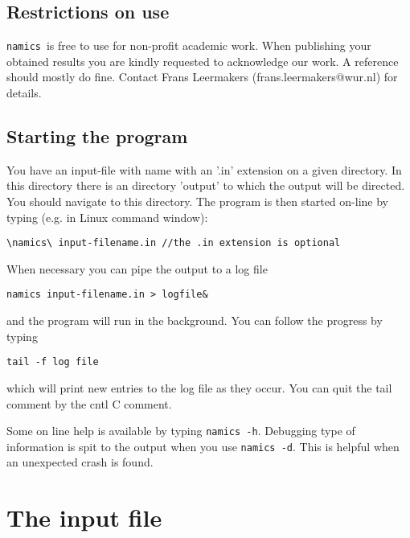 \documentclass{article}
\newcommand{\namics}{{\tt namics}}
\begin{document}
\subsection{Restrictions on use}

\namics\ is free to use for non-profit academic work.  When publishing your obtained results you are kindly requested to acknowledge our work.  A reference should mostly do fine.  Contact Frans Leermakers (frans.leermakers@wur.nl) for details.

\subsection{Starting the program} 

You have an input-file with name with an '.in' extension on a given directory. In this directory there is an directory 'output' to which the output will be directed. You should navigate to this directory. The program is then started on-line by typing (e.g. in Linux command window):

\begin{verbatim}
\namics\ input-filename.in //the .in extension is optional
\end{verbatim}
When necessary you can pipe the output to a log file
\begin{verbatim}
namics input-filename.in > logfile&
\end{verbatim}
and the program will run in the background. You can follow the progress by typing
\begin{verbatim}
tail -f log file
\end{verbatim}
which will print new entries to the log file as they occur. You can quit the tail comment by the cntl C comment.

Some on line help is available by typing {\tt namics -h}. 
Debugging type of information is spit to the output when you use {\tt namics -d}. This is helpful when an unexpected crash is found. 

\section{The input file}
\end{document}
